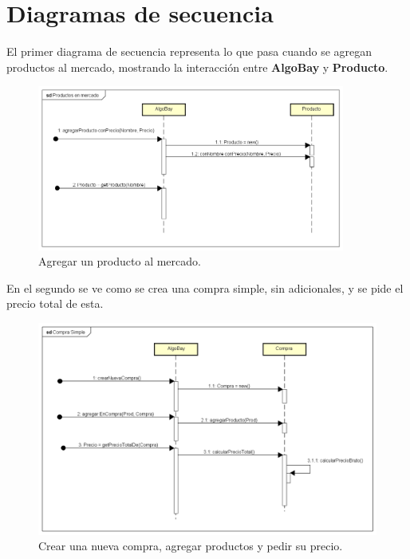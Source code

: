\documentclass[titlepage,a4paper]{article}
\begin{document}
\section{Diagramas de secuencia}\label{sec:diagramasdesecuencia}

El primer diagrama de secuencia representa lo que pasa cuando se agregan productos al mercado, mostrando la interacción entre \textbf{AlgoBay} y \textbf{Producto}.
\begin{figure}[H]
\centering
\includegraphics[width=0.9\textwidth]{1productos.png}
\caption{\label{fig:seq01}Agregar un producto al mercado.}
\end{figure}

En el segundo se ve como se crea una compra simple, sin adicionales, y se pide el precio total de esta.
\begin{figure}[H]
\centering
\includegraphics[width=1\textwidth]{2compra.png} 
\caption{\label{fig:seq02}Crear una nueva compra, agregar productos y pedir su precio.}
\end{figure}
\end{document}

